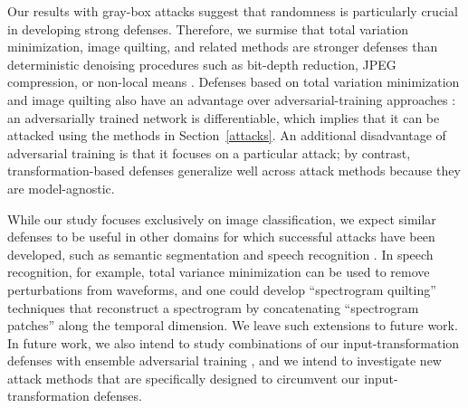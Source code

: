 Our results with gray-box attacks suggest that randomness is particularly crucial in developing strong defenses. Therefore, we surmise that total variation minimization, image quilting, and related methods \citep{dong11centralized} are stronger defenses than deterministic denoising procedures such as bit-depth reduction, JPEG compression, or non-local means \citep{buades05nonlocal}. Defenses based on total variation minimization and image quilting also have an advantage over adversarial-training approaches \citep{kurakin2016adversarial}: an adversarially trained network is differentiable, which implies that it can be attacked using the methods in Section~\ref{attacks}. An additional disadvantage of adversarial training is that it focuses on a particular attack; by contrast, transformation-based defenses generalize well across attack methods because they are model-agnostic.

While our study focuses exclusively on image classification, we expect similar defenses to be useful in other domains for which successful attacks have been developed, such as semantic segmentation and speech recognition \citep{cisse2017houdini, zhang17dolphin}. In speech recognition, for example, total variance minimization can be used to remove perturbations from waveforms, and one could develop ``spectrogram quilting'' techniques that reconstruct a spectrogram by concatenating ``spectrogram patches'' along the temporal dimension. We leave such extensions to future work. In future work, we also intend to study combinations of our input-transformation defenses with ensemble adversarial training \citep{tramer2017ensemble}, and we intend to investigate new attack methods that are specifically designed to circumvent our input-transformation defenses. 